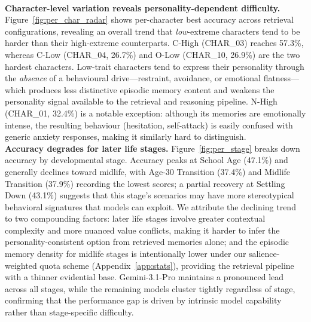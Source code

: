 \documentclass{article}
\begin{document}
\\ \textbf{Character-level variation reveals personality-dependent difficulty.} Figure~\ref{fig:per_char_radar} shows per-character best accuracy across retrieval configurations, revealing an overall trend that \emph{low}-extreme characters tend to be harder than their high-extreme counterparts. C-High (CHAR\_03) reaches 57.3\%, whereas C-Low (CHAR\_04, 26.7\%) and O-Low (CHAR\_10, 26.9\%) are the two hardest characters. Low-trait characters tend to express their personality through the \emph{absence} of a behavioural drive---restraint, avoidance, or emotional flatness---which produces less distinctive episodic memory content and weakens the personality signal available to the retrieval and reasoning pipeline. N-High (CHAR\_01, 32.4\%) is a notable exception: although its memories are emotionally intense, the resulting behaviour (hesitation, self-attack) is easily confused with generic anxiety responses, making it similarly hard to distinguish.
\\ \textbf{Accuracy degrades for later life stages.} Figure~\ref{fig:per_stage} breaks down accuracy by developmental stage. Accuracy peaks at School Age (47.1\%) and generally declines toward midlife, with Age-30 Transition (37.4\%) and Midlife Transition (37.9\%) recording the lowest scores; a partial recovery at Settling Down (43.1\%) suggests that this stage's scenarios may have more stereotypical behavioral signatures that models can exploit. We attribute the declining trend to two compounding factors: later life stages involve greater contextual complexity and more nuanced value conflicts, making it harder to infer the personality-consistent option from retrieved memories alone; and the episodic memory density for midlife stages is intentionally lower under our salience-weighted quota scheme (Appendix~\ref{app:stats}), providing the retrieval pipeline with a thinner evidential base. Gemini-3.1-Pro maintains a pronounced lead across all stages, while the remaining models cluster tightly regardless of stage, confirming that the performance gap is driven by intrinsic model capability rather than stage-specific difficulty.
\end{document}
